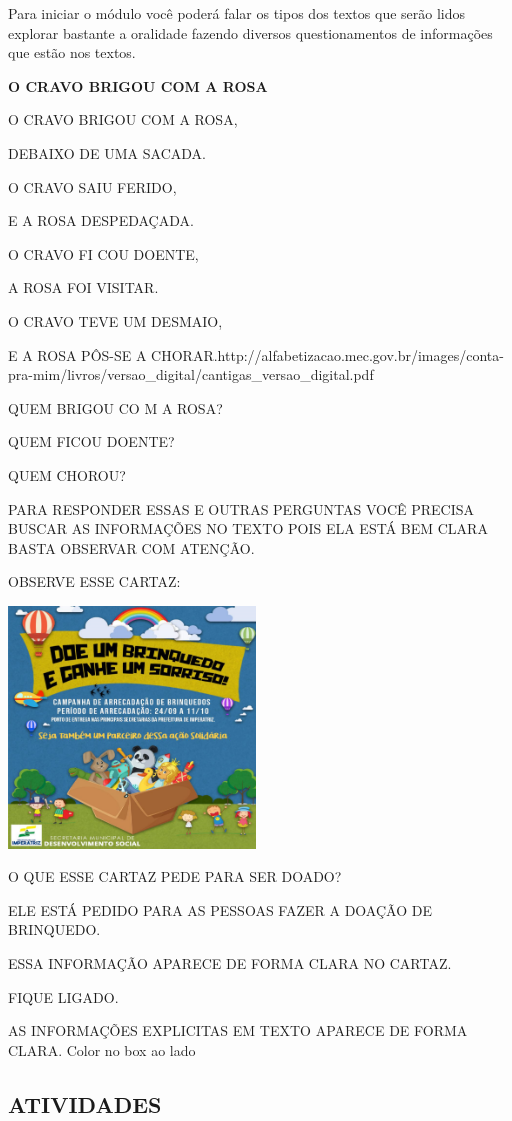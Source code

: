 Para iniciar o módulo você poderá falar os tipos dos textos que serão
lidos explorar bastante a oralidade fazendo diversos questionamentos de
informações que estão nos textos.

\textbf{O CRAVO BRIGOU COM A ROSA}

O CRAVO BRIGOU COM A ROSA,

DEBAIXO DE UMA SACADA.

O CRAVO SAIU FERIDO,

E A ROSA DESPEDAÇADA.

O CRAVO FI COU DOENTE,

A ROSA FOI VISITAR.

O CRAVO TEVE UM DESMAIO,

E A ROSA PÔS-SE A
CHORAR.http://alfabetizacao.mec.gov.br/images/conta-pra-mim/livros/versao\_digital/cantigas\_versao\_digital.pdf

QUEM BRIGOU CO M A ROSA?

QUEM FICOU DOENTE?

QUEM CHOROU?

PARA RESPONDER ESSAS E OUTRAS PERGUNTAS VOCÊ PRECISA BUSCAR AS
INFORMAÇÕES NO TEXTO POIS ELA ESTÁ BEM CLARA BASTA OBSERVAR COM ATENÇÃO.

OBSERVE ESSE CARTAZ:

\includegraphics[width=2.57847in,height=2.52847in]{media/image82.png}

O QUE ESSE CARTAZ PEDE PARA SER DOADO?

ELE ESTÁ PEDIDO PARA AS PESSOAS FAZER A DOAÇÃO DE BRINQUEDO.

ESSA INFORMAÇÃO APARECE DE FORMA CLARA NO CARTAZ.

FIQUE LIGADO.

AS INFORMAÇÕES EXPLICITAS EM TEXTO APARECE DE FORMA CLARA. Color no box
ao lado

\subsection{ATIVIDADES}\label{atividades-2}

